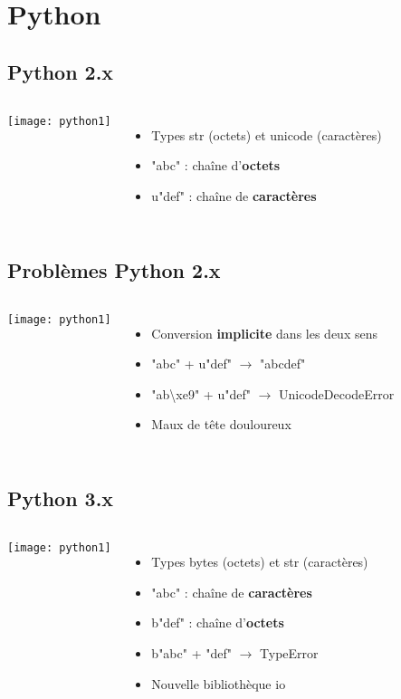 \section{Python}

\subsection{Python 2.x}
\frame
{
    \begin{columns}[c]
            \texttt{[image: python1]}
            \begin{itemize}
            \item Types str (octets) et unicode (caractères)
            \item "abc" : chaîne d'\textbf{octets}
            \item u"def" : chaîne de \textbf{caractères}
            \end{itemize}
    \end{columns}
}

\subsection{Problèmes Python 2.x}
\frame
{
    \begin{columns}[c]
            \texttt{[image: python1]}
            \begin{itemize}
            \item Conversion \textbf{implicite} dans les deux sens
            \item "abc" + u"def" $\rightarrow$ "abcdef"
            \item "ab\textbackslash xe9" + u"def" $\rightarrow$ UnicodeDecodeError
            \item Maux de tête douloureux
            \end{itemize}
    \end{columns}
}

\subsection{Python 3.x}
\frame
{
    \begin{columns}[c]
            \texttt{[image: python1]}
            \begin{itemize}
            \item Types bytes (octets) et str (caractères)
            \item "abc" : chaîne de \textbf{caractères}
            \item b"def" : chaîne d'\textbf{octets}
            \item b"abc" + "def" $\rightarrow$ TypeError
            \item Nouvelle bibliothèque io
            \end{itemize}
    \end{columns}
}

